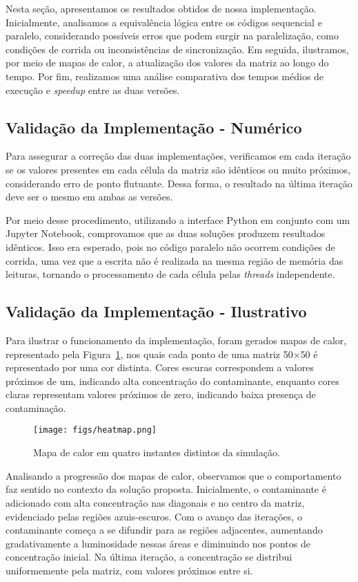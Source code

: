 \documentclass[12pt]{article}
\begin{document}
Nesta seção, apresentamos os resultados obtidos de nossa implementação.
Inicialmente, analisamos a equivalência lógica entre os códigos sequencial e
paralelo, considerando possíveis erros que podem surgir na paralelização, como
condições de corrida ou inconsistências de sincronização. Em seguida,
ilustramos, por meio de mapas de calor, a atualização dos valores da matriz ao
longo do tempo. Por fim, realizamos uma análise comparativa dos tempos médios
de execução e \textit{speedup} entre as duas versões.

\subsection{Validação da Implementação - Numérico}

Para assegurar a correção das duas implementações, verificamos em cada iteração
se os valores presentes em cada célula da matriz são idênticos ou muito
próximos, considerando erro de ponto flutuante. Dessa forma, o resultado na
última iteração deve ser o mesmo em ambas as versões.

Por meio desse procedimento, utilizando a interface Python em conjunto com um
Jupyter Notebook, comprovamos que as duas soluções produzem resultados
idênticos. Isso era esperado, pois no código paralelo não ocorrem condições de
corrida, uma vez que a escrita não é realizada na mesma região de memória das
leituras, tornando o processamento de cada célula pelas \textit{threads}
independente.

\subsection{Validação da Implementação - Ilustrativo}

Para ilustrar o funcionamento da implementação, foram gerados mapas de calor,
representado pela Figura~\ref{fig:heatmap}, nos quais cada ponto de uma matriz
50$\times$50 é representado por uma cor distinta. Cores escuras correspondem a
valores próximos de um, indicando alta concentração do contaminante, enquanto
cores claras representam valores próximos de zero, indicando baixa presença de
contaminação.

\begin{figure}[htb]
  \centering
  \texttt{[image: figs/heatmap.png]}
  \caption{Mapa de calor em quatro instantes distintos da simulação.}\label{fig:heatmap}
\end{figure}

Analisando a progressão dos mapas de calor, observamos que o comportamento faz
sentido no contexto da solução proposta. Inicialmente, o contaminante é
adicionado com alta concentração nas diagonais e no centro da matriz,
evidenciado pelas regiões azuis-escuros. Com o avanço das iterações, o
contaminante começa a se difundir para as regiões adjacentes, aumentando
gradativamente a luminosidade nessas áreas e diminuindo nos pontos de
concentração inicial. Na última iteração, a concentração se distribui
uniformemente pela matriz, com valores próximos entre si.
\end{document}
